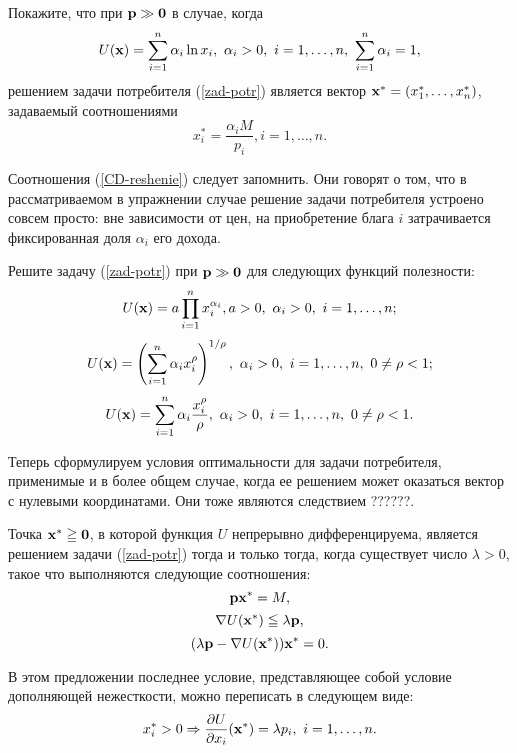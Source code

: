 \begin{exer}
\label{CD-resh}
    Покажите, что при $\mathbf{p}\gg\mathbf{0}$ в случае, когда
    \[U(\vc{x})=\sum_{i=1}^{n}\alpha_{i}\ln x_{i}, \ \alpha_{i}>0, \
     i=1,\ldots,n, \ \sum_{i=1}^{n}\alpha_{i}=1,\]
     решением задачи потребителя (\ref{zad-potr}) является вектор
     $\mathbf{x^{*}}=(x^{*}_{1},\ldots,x^{*}_{n})$, задаваемый соотношениями
\begin{equation}
\label{CD-reshenie}
     x^{*}_{i}=\frac{\alpha_{i}M}{p_{i}}, i=1,\ldots,n.
\end{equation}
\end{exer}
    Соотношения (\ref{CD-reshenie}) следует запомнить. Они говорят о
    том, что в рассматриваемом в упражнении случае решение задачи
    потребителя устроено совсем просто: вне зависимости от цен, на
    приобретение блага $i$ затрачивается фиксированная доля
    $\alpha_{i}$ его дохода.

\begin{exer}
    Решите задачу (\ref{zad-potr}) при $\mathbf{p}\gg\mathbf{0}$ для
    следующих функций полезности:
    \[U(\mathbf{x})=a\prod_{i=1}^{n}x_{i}^{\alpha_{i}}, a>0, \ \alpha_{i}>0, \ i=1,\ldots,n;\]
    \[U(\mathbf{x})=\left(\sum_{i=1}^{n}\alpha_{i}x_{i}^{\rho}\right)^{1/\rho},
     \ \alpha_{i}>0, \ i=1,\ldots,n, \ 0\neq\rho<1;\]
    \[U(\mathbf{x})=\sum_{i=1}^{n}\alpha_{i}\frac{x_{i}^{\rho}}{\rho}, \
    \alpha_{i}>0, \ i=1,\ldots,n, \ 0\neq\rho<1.\]
\end{exer}


    Теперь сформулируем условия оптимальности для задачи потребителя, применимые и в более
    общем случае, когда ее решением может оказаться вектор с нулевыми
    координатами. Они тоже являются следствием
    ??????.

\begin{prop}
    \label{usl-opt-zad-potr-2}
    Точка $\mathbf{x^{*}}\geqq\mathbf{0}$, в которой функция $U$ непрерывно дифференцируема,
     является решением задачи
    (\ref{zad-potr}) тогда и только тогда, когда существует число
    $\lambda>0$, такое что выполняются следующие соотношения:
    \[\mathbf{p}\mathbf{x^{*}}=M,\]
    \[\nabla U(\mathbf{x^{*}})\leqq\lambda\mathbf{p},\]
    \[(\lambda\mathbf{p}-\nabla U(\mathbf{x^{*}}))\mathbf{x^{*}}=0.\]
\end{prop}

    В этом предложении последнее условие, представляющее собой
    условие дополняющей нежесткости, можно переписать в следующем
    виде:
\[x^{*}_{i}>0 \Rightarrow \frac{\partial U}{\partial x_{i}}(\mathbf{x^{*}})=\lambda p_{i},
    \ i=1,\ldots,n.\]

